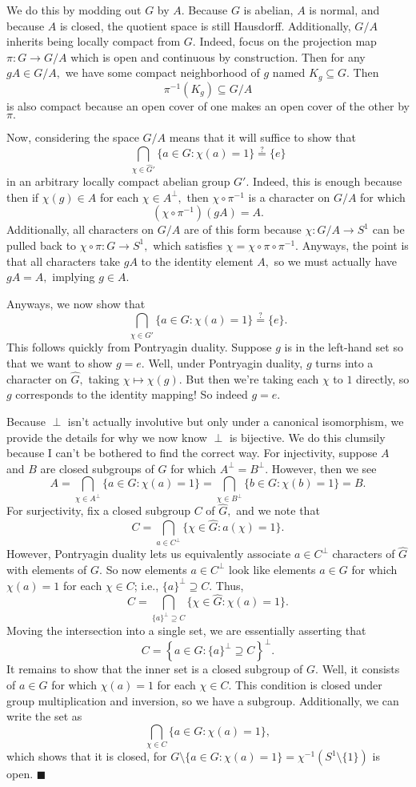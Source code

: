 We do this by modding out $G$ by $A.$ Because $G$ is abelian, $A$ is normal, and because $A$ is closed, the quotient space is still Hausdorff. Additionally, $G/A$ inherits being locally compact from $G.$ Indeed, focus on the projection map $\pi:G\to G/A$ which is open and continuous by construction. Then for any $gA\in G/A,$ we have some compact neighborhood of $g$ named $K_g\subseteq G.$ Then
\[\pi^{-1}(K_g)\subseteq G/A\]
is also compact because an open cover of one makes an open cover of the other by $\pi.$

Now, considering the space $G/A$ means that it will suffice to show that
\[\bigcap_{\chi\in\widehat G'}\{a\in G:\chi(a)=1\}\stackrel?=\{e\}\]
in an arbitrary locally compact abelian group $G'.$ Indeed, this is enough because then if $\chi(g)\in A$ for each $\chi\in A^\perp,$ then $\chi\circ\pi^{-1}$ is a character on $G/A$ for which
\[\left(\chi\circ\pi^{-1}\right)(gA)=A.\]
Additionally, all characters on $G/A$ are of this form because $\chi:G/A\to S^1$ can be pulled back to $\chi\circ\pi:G\to S^1,$ which satisfies $\chi=\chi\circ\pi\circ\pi^{-1}.$ Anyways, the point is that all characters take $gA$ to the identity element $A,$ so we must actually have $gA=A,$ implying $g\in A.$

Anyways, we now show that
\[\bigcap_{\chi\in\widehat G'}\{a\in G:\chi(a)=1\}\stackrel?=\{e\}.\]
This follows quickly from Pontryagin duality. Suppose $g$ is in the left-hand set so that we want to show $g=e.$ Well, under Pontryagin duality, $g$ turns into a character on $\widehat G,$ taking $\chi\mapsto\chi(g).$ But then we're taking each $\chi$ to $1$ directly, so $g$ corresponds to the identity mapping! So indeed $g=e.$

Because $\perp$ isn't actually involutive but only under a canonical isomorphism, we provide the details for why we now know $\perp$ is bijective. We do this clumsily because I can't be bothered to find the correct way. For injectivity, suppose $A$ and $B$ are closed subgroups of $G$ for which $A^\perp=B^\perp.$ However, then we see
\[A=\bigcap_{\chi\in A^\perp}\{a\in G:\chi(a)=1\}=\bigcap_{\chi\in B^\perp}\{b\in G:\chi(b)=1\}=B.\]
For surjectivity, fix a closed subgroup $C$ of $\widehat G,$ and we note that
\[C=\bigcap_{a\in C^\perp}\big\{\chi\in\widehat G:a(\chi)=1\big\}.\]
However, Pontryagin duality lets us equivalently associate $a\in C^\perp$ characters of $\widehat G$ with elements of $G.$ So now elements $a\in C^\perp$ look like elements $a\in G$ for which $\chi(a)=1$ for each $\chi\in C$; i.e., $\{a\}^\perp\supseteq C.$ Thus,
\[C=\bigcap_{\{a\}^\perp\supseteq C}\big\{\chi\in\widehat G:\chi(a)=1\big\}.\]
Moving the intersection into a single set, we are essentially asserting that
\[C=\left\{a\in G:\{a\}^\perp\supseteq C\right\}^\perp.\]
It remains to show that the inner set is a closed subgroup of $G.$ Well, it consists of $a\in G$ for which $\chi(a)=1$ for each $\chi\in C.$ This condition is closed under group multiplication and inversion, so we have a subgroup. Additionally, we can write the set as
\[\bigcap_{\chi\in C}\{a\in G:\chi(a)=1\},\]
which shows that it is closed, for $G\setminus\{a\in G:\chi(a)=1\}=\chi^{-1}(S^1\setminus\{1\})$ is open. $\blacksquare$

